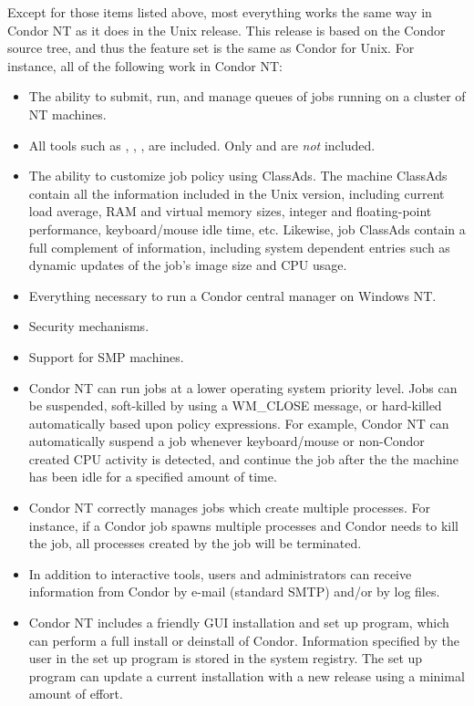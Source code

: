 Except for those items listed above, most everything works
the same way in Condor NT as it does in the Unix release.
This release is based on the Condor \VersionNotice source tree, and thus the
feature set is the same as Condor \VersionNotice for Unix.  
For instance, all of the following work in Condor NT:
\begin{itemize}

\item The ability to submit, run, and manage queues of jobs running on a
cluster of NT machines.

\item All tools such as , , ,
are included. Only  and  are
\emph{not} included.

\item The ability to customize job policy using ClassAds.
The machine ClassAds contain all the information included in the Unix version,
including current load average, RAM and virtual memory sizes, integer and
floating-point performance, keyboard/mouse idle time, etc.  Likewise, job
ClassAds contain a full complement of information, including system
dependent entries such as dynamic updates of the job's image size and CPU
usage.

\item Everything necessary to run a Condor central manager on Windows NT.

\item Security mechanisms.

\item Support for SMP machines.

\item Condor NT can run jobs at a lower operating system priority level.
Jobs can be suspended, soft-killed by using a WM\_CLOSE message,
or hard-killed automatically based upon policy expressions.
For example, Condor NT can automatically suspend a job
whenever keyboard/mouse or non-Condor created CPU activity is detected, and
continue the job after the the machine has been idle for a specified amount
of time.

\item Condor NT correctly manages jobs which create multiple processes.  For
instance, if a Condor job spawns multiple processes and Condor
needs to kill the job,
all processes created by the job will be terminated.

\item In addition to interactive tools, users and administrators can receive
information from Condor by e-mail (standard SMTP) and/or by log files.

\item Condor NT includes a friendly GUI installation and set up program,
which can perform a full install or deinstall of Condor.
Information specified by the user in the set up program is stored in the
system registry.  
The set up program can update a current installation with a
new release using a minimal amount of effort.

\end{itemize}


